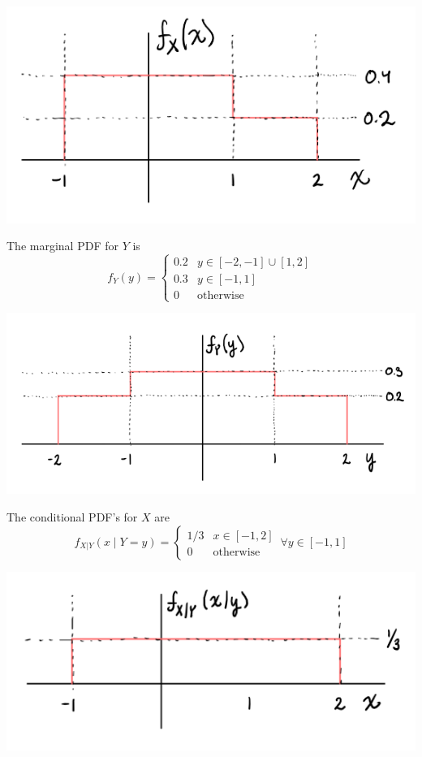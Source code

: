 \documentclass{article}
\begin{document}
\begin{center}
    \includegraphics[scale=0.5]{Images/P1Ai.PNG}
\end{center}

The marginal PDF for $Y$ is
$$ f_Y(y) = \begin{cases}
    0.2 & y \in [-2, -1] \cup [1, 2] \\
    0.3 & y \in [-1, 1] \\
    0 & \mathrm{otherwise}
\end{cases} $$

\begin{center}
    \includegraphics[scale=0.5]{Images/P1Aii.PNG}
\end{center}

The conditional PDF's for $X$ are
$$ f_{X|Y}(x \mid Y = y) = \begin{cases}
    1/3 & x \in [-1, 2] \\
    0 & \mathrm{otherwise}
\end{cases}\, \forall y \in [-1, 1]$$

\begin{center}
    \includegraphics[scale=0.5]{Images/P1Aiii.PNG}
\end{center}
\end{document}
